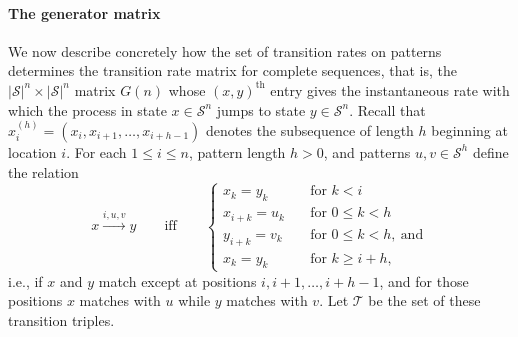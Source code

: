 \documentclass{article}
\newcommand{\calS}{\mathcal{S}}  %
\newcommand{\calT}{\mathcal{T}}  %
\theoremstyle{plain}
\theoremstyle{definition}
\begin{document}
\paragraph{The generator matrix}
We now describe concretely how the set of transition rates on patterns determines the transition rate matrix for complete sequences, that is,
the $|\calS|^n \times |\calS|^n$ matrix $G(n)$ whose $(x,y)^\text{th}$ entry gives the instantaneous rate
with which the process in state $x \in \calS^n$ jumps to state $y \in \calS^n$.
Recall that $x_i^{(h)} = (x_i, x_{i+1}, \ldots, x_{i+h-1})$ denotes the subsequence of length $h$ beginning at location $i$.
For each $1\le i \le n$, pattern length $h > 0$, and patterns $u,v \in \calS^h$ define the relation
\[
x \xrightarrow{i,u,v} y \qquad \text{iff} \qquad \begin{cases}
  x_k = y_k \quad &\text{for } k<i \\
  x_{i+k} = u_k \quad &\text{for } 0 \le k < h \\
  y_{i+k} = v_k \quad &\text{for } 0 \le k < h,\ \text{and} \\
  x_k = y_k \quad &\text{for } k\ge i+h ,
\end{cases}
\]
i.e., if $x$ and $y$ match except at positions $i,i+1,\ldots,i+h-1$,
and for those positions $x$ matches with $u$ while $y$ matches with $v$.
Let $\calT$ be the set of these transition triples.
\end{document}
